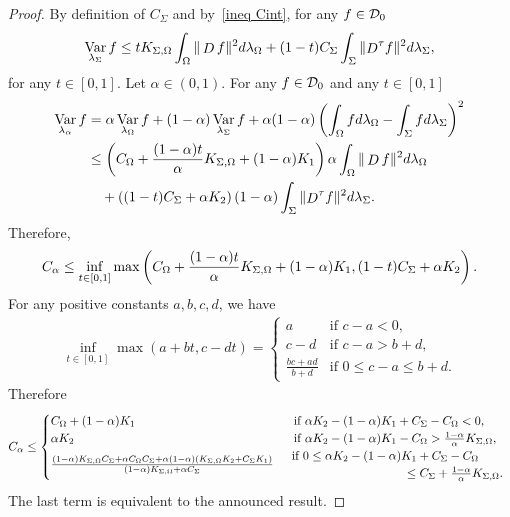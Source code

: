 \documentclass[a4paper]{article}
\theoremstyle{definition}
\DeclareMathOperator{\Var}{Var}
\numberwithin{equation}{section}
\begin{document}
\begin{proof}
By definition of $C_\Sigma$ and by~\eqref{ineq Cint}, for any $f \in \mathcal {D}_0$
\begin{align*}
\Var_{\lambda_\Sigma} f \leq t \Cint \int_\Omega \| \Deriv f \|^2 d\lambda_\Omega + (1-t) C_\Sigma \int_\Sigma \| \bDeriv f \|^2 d\lambda_\Sigma,
\end{align*}
for any $t \in [0,1]$. 
Let $\alpha \in (0,1)$. For any $f  \in \mathcal {D}_0$ and any $t \in [0,1]$
\begin{align*}
\Var_{\lambda_\alpha} f 
&= \alpha \Var_{\lambda_\Omega} f + (1-\alpha) \Var_{\lambda_\Sigma} f
+\alpha(1-\alpha) \left( \int_\Omega f d \lambda_\Omega - \int_\Sigma f d \lambda_\Sigma \right)^2 \\
&\leq \left( C_\Omega +\frac{(1-\alpha)t}{\alpha} \Cint + (1-\alpha) K_1 \right) \alpha \int_\Omega \| \Deriv f \|^2 d\lambda_\Omega \\
&\quad+ \left( (1-t) C_\Sigma +  \alpha K_2 \right) (1-\alpha)\int_\Sigma \| \bDeriv f \|^2 d\lambda_\Sigma.
\end{align*}
Therefore,
\begin{align*}
C_\alpha \leq \inf_{t \in [0,1]} \max\left(C_\Omega +\frac{(1-\alpha)t}{\alpha} K_{\Sigma,\Omega} + (1-\alpha) K_1 ,(1-t) C_\Sigma +  \alpha K_2 \right).
\end{align*}
For any positive constants $a,b,c,d$, we have
\begin{align*}
\inf_{t \in [0,1]} \max\left(a+bt,c-dt\right)
= 
\begin{cases}
a &\text{if } c-a<0,\\
c-d &\text{if } c-a>b+d,\\
\frac{bc+ad}{b+d} &\text{if } 0\leq c-a \leq b+d.
\end{cases}
\end{align*}
Therefore
\begin{align*}
C_\alpha \leq
\begin{cases}
C_\Omega + (1-\alpha)K_1 &\text{\ \ if }  \alpha K_2-(1-\alpha)K_1 + C_\Sigma-C_\Omega <0,\\
\alpha K_2 &\text{\ \ if }  \alpha K_2-(1-\alpha)K_1 -C_\Omega >  \frac{1-\alpha}{\alpha}K_{\Sigma,\Omega},\\
\frac{(1-\alpha)K_{\Sigma,\Omega} C_\Sigma +\alpha C_\Omega C_\Sigma+\alpha(1-\alpha)(K_{\Sigma,\Omega} K_2+C_\Sigma K_1)}{(1-\alpha) K_{\Sigma,\Omega} + \alpha C_\Sigma} &\begin{array}{r}
     \text{if } 0 \leq \alpha K_2-(1-\alpha)K_1 + C_\Sigma-C_\Omega\quad\quad   \\
     \leq C_\Sigma + \frac{1-\alpha}{\alpha}K_{\Sigma,\Omega}.
\end{array}
\end{cases}
\end{align*}
The last term is equivalent to the announced result. 
\end{proof}
\end{document}
